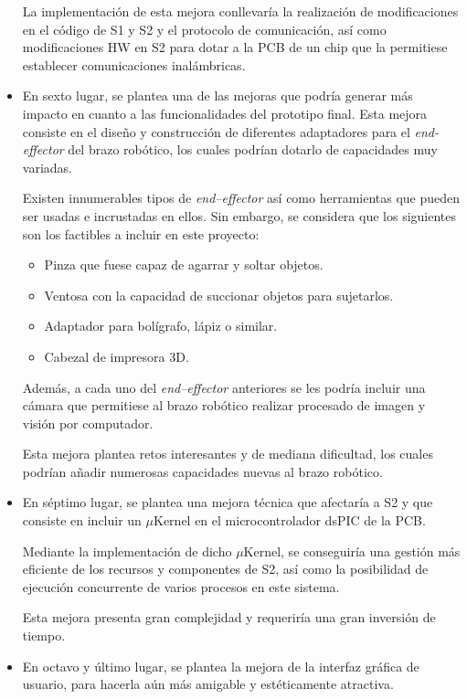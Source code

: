 \begin{itemize}
    La implementación de esta mejora conllevaría la realización de modificaciones en el código de \ac{S1} y \ac{S2} y el protocolo de comunicación, así como modificaciones \ac{HW} en \ac{S2} para dotar a la PCB de un chip que la permitiese establecer comunicaciones inalámbricas.
    
    \item En sexto lugar, se plantea una de las mejoras que podría generar más impacto en cuanto a las funcionalidades del prototipo final. Esta mejora consiste en el diseño y construcción de diferentes adaptadores para el \textit{end-effector} del brazo robótico, los cuales podrían dotarlo de capacidades muy variadas.
    
    Existen innumerables tipos de \textit{end--effector} así como herramientas que pueden ser usadas e incrustadas en ellos. Sin embargo, se considera que los siguientes son los factibles a incluir en este proyecto:
    \begin{itemize}
        \item Pinza que fuese capaz de agarrar y soltar objetos.
        \item Ventosa con la capacidad de succionar objetos para sujetarlos.
        \item Adaptador para bolígrafo, lápiz o similar.
        \item Cabezal de impresora 3D.
    \end{itemize}
    Además, a cada uno del \textit{end--effector} anteriores se les podría incluir una cámara que permitiese al brazo robótico realizar procesado de imagen y visión por computador.
    
    Esta mejora plantea retos interesantes y de mediana dificultad, los cuales podrían añadir numerosas capacidades nuevas al brazo robótico.
    
    \item En séptimo lugar, se plantea una mejora técnica que afectaría a \ac{S2} y que consiste en incluir un $\mu$Kernel en el microcontrolador dsPIC de la PCB.
    
    Mediante la implementación de dicho $\mu$Kernel, se conseguiría una gestión más eficiente de los recursos y componentes de \ac{S2}, así como la posibilidad de ejecución concurrente de varios procesos en este sistema.
    
    Esta mejora presenta gran complejidad y requeriría una gran inversión de tiempo.
    
    \item En octavo y último lugar, se plantea la mejora de la interfaz gráfica de usuario, para hacerla aún más amigable y estéticamente atractiva.
    

\end{itemize}
